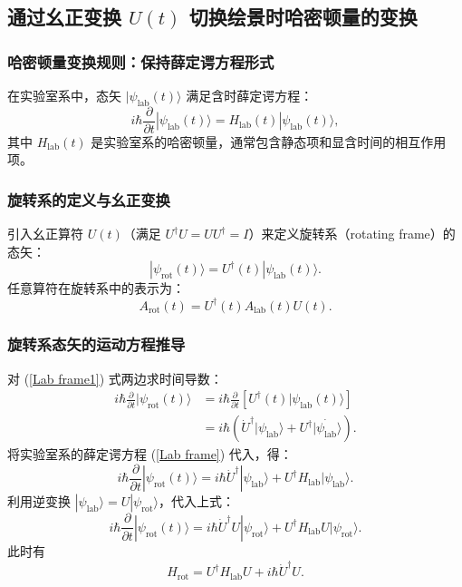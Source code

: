 \subsection{通过幺正变换 \(U(t)\) 切换绘景时哈密顿量的变换}
\subsubsection{哈密顿量变换规则：保持薛定谔方程形式}
在实验室系中，态矢 \(|\psi_{\text{lab}}(t)\rangle\) 满足含时薛定谔方程：
\begin{equation}\label{Lab frame}
	i\hbar \frac{\partial}{\partial t} |\psi_{\text{lab}}(t)\rangle = H_{\text{lab}}(t) |\psi_{\text{lab}}(t)\rangle ,
\end{equation}
其中 \(H_{\text{lab}}(t)\) 是实验室系的哈密顿量，通常包含静态项和显含时间的相互作用项。

\subsubsection{旋转系的定义与幺正变换}
引入幺正算符 \(U(t)\)（满足 \(U^\dagger U = UU^\dagger = I\)）来定义旋转系（rotating frame）的态矢：
\begin{equation}\label{Lab frame1}
	|\psi_{\text{rot}}(t)\rangle = U^\dagger(t) |\psi_{\text{lab}}(t)\rangle .
\end{equation}
任意算符在旋转系中的表示为：
\begin{equation}
	A_{\text{rot}}(t) = U^\dagger(t) A_{\text{lab}}(t) U(t).
\end{equation}

\subsubsection{旋转系态矢的运动方程推导}
对 (\ref{Lab frame1}) 式两边求时间导数：
\begin{align}
	i\hbar \frac{\partial}{\partial t} |\psi_{\text{rot}}(t)\rangle 
	&= i\hbar \frac{\partial}{\partial t} \left[ U^\dagger(t) |\psi_{\text{lab}}(t)\rangle \right] \nonumber \\
	&= i\hbar \left( \dot{U}^\dagger |\psi_{\text{lab}}\rangle + U^\dagger \dot{|\psi_{\text{lab}}\rangle} \right).
\end{align}
将实验室系的薛定谔方程 (\ref{Lab frame}) 代入，得：
\begin{equation}
	i\hbar \frac{\partial}{\partial t} |\psi_{\text{rot}}(t)\rangle = i\hbar \dot{U}^\dagger |\psi_{\text{lab}}\rangle + U^\dagger H_{\text{lab}} |\psi_{\text{lab}}\rangle .
\end{equation}
利用逆变换 \(|\psi_{\text{lab}}\rangle = U |\psi_{\text{rot}}\rangle\)，代入上式：
\begin{equation}
	i\hbar \frac{\partial}{\partial t} |\psi_{\text{rot}}(t)\rangle = i\hbar \dot{U}^\dagger U |\psi_{\text{rot}}\rangle + U^\dagger H_{\text{lab}} U |\psi_{\text{rot}}\rangle .
\end{equation}
此时有
\begin{equation}\label{Lab frame2}
	\boxed{ H_{\text{rot}} = U^\dagger H_{\text{lab}} U + i\hbar \dot{U}^\dagger U } .
\end{equation}
